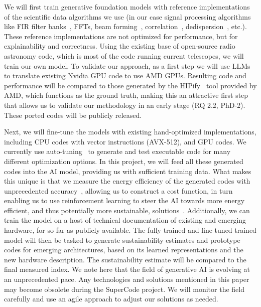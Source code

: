 \documentclass[a4wide,twocolumn]{article}
\begin{document}
We will first train generative foundation models with reference implementations of the scientific data algorithms we use (in our case signal processing algorithms like FIR filter banks~\cite{van2012polyphase}, FFTs, beam forming~\cite{sclocco2012radio}, correlation~\cite{broekema_cobalt_2018,van2010building,van2011correlating,romein_tensor-core_2021}, dedispersion~\cite{sclocco2016real,sclocco2014auto}, etc.). These reference implementations are not optimized for performance, but for explainability and correctness. Using the existing base of open-source radio astronomy code, which is most of the code running current telescopes, we will train our own model. To validate our approach, as a first step we will use LLMs to translate existing Nvidia GPU code to use AMD GPUs. Resulting code and performance will be compared to those generated by the HIPify~\cite{homerding_evaluating_2020} tool provided by AMD, which functions as the ground truth, making this an attractive first step that allows us to validate our methodology in an early stage (RQ 2.2, PhD-2). These ported codes will be publicly released.

Next, we will fine-tune the models with existing hand-optimized implementations, including CPU codes with vector instructions (AVX-512), and GPU codes. We currently use auto-tuning~\cite{sclocco2016real,sclocco2014auto,van_werkhoven_kernel_2019} to generate and test executable code for many different optimization options. In this project, we will feed all these generated codes into the AI model, providing us with sufficient training data. What makes this unique is that we measure the energy efficiency of the generated codes with unprecedented accuracy~\cite{van_werkhoven_kernel_2019}, allowing us to construct a cost function, in turn enabling us to use reinforcement learning to steer the AI towards more energy efficient, and thus potentially more sustainable, solutions~\cite{le_coderl_2022}. Additionally, we can train the model on a host of technical documentation of existing and emerging hardware, for so far as publicly available. The fully trained and fine-tuned trained model will then be tasked to generate sustainability estimates and prototype codes for emerging architectures, based on its learned representations and the new hardware description. The sustainability estimate will be compared to the final measured index. We note here that the field of generative AI is evolving at an unprecedented pace. Any technologies and solutions mentioned in this paper may become obsolete during the SuperCode project. We will monitor the field carefully and use an agile approach to adjust our solutions as needed.
\end{document}
